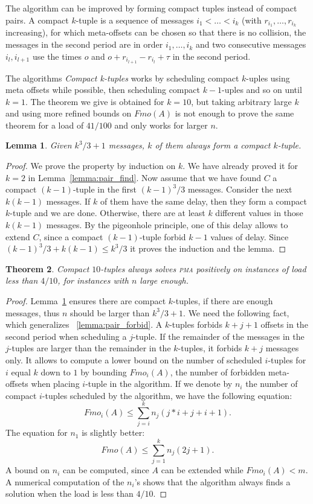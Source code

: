 \documentclass[10pt, conference, letterpaper]{IEEEtran}
\newtheorem{theorem}{Theorem}
\newtheorem{lemma}[theorem]{Lemma}
\newcommand\pma{\textsc{pma}\xspace}
\begin{document}
The algorithm can be improved by forming compact tuples instead of compact pairs.
A compact $k$-tuple is a sequence of messages $i_1 < \dots < i_k$ (with $r_{i_1},\dots,r_{i_k}$ increasing), for which meta-offsets can be chosen so that there is no collision,
the messages in the second period are in order $i_1,\dots,i_k$ and two consecutive messages $i_{l},i_{l+1}$ use the times $o$ and $o + r_{i_{l+1}} -r_{i_{l}} + \tau$ in the second period.

The algorithms \emph{Compact k-tuples} works by scheduling compact $k$-uples
using meta offsets while possible, then scheduling compact $k-1$-uples and so on until $k=1$.
The theorem we give is obtained for $k=10$, but taking arbitrary large $k$ and using more refined bounds on $Fmo(A)$ is not enough to prove the same theorem for a load of $41/100$ and only works for larger $n$.


\begin{lemma}\label{lemma:uple_find}
Given $k^3/3 + 1$ messages, $k$ of them always form a compact $k$-tuple. 
\end{lemma}
\begin{proof}
We prove the property by induction on $k$. We have already proved it for $k=2$ in Lemma~\ref{lemma:pair_find}.
Now assume that we have found $C$ a compact $(k-1)$-tuple in the first $(k-1)^3/3$
messages. Consider the next $k(k-1)$ messages. If $k$ of them have the same delay,
then they form a compact $k$-tuple and we are done. Otherwise, there are at least $k$ different values
in those $k(k-1)$ messages. By the pigeonhole principle, one of this delay allows to extend $C$, since 
a compact $(k-1)$-tuple forbid $k-1$ values of delay. Since $(k-1)^3/3 + k(k-1) \leq k^3/3$ it proves the induction and the lemma.
\end{proof}


\begin{theorem}
Compact $10$-tuples always solves \pma positively on instances of load less than $4/10$, for instances with $n$ large enough.
\end{theorem}
\begin{proof}
Lemma~\ref{lemma:uple_find} ensures there are compact $k$-tuples, if there are enough messages,
thus $n$ should be larger than $k^3/3 +1$. 
We need the following fact, which generalizes ~\ref{lemma:pair_forbid}. A $k$-tuples forbids $k+j+1$ offsets in the second period when scheduling a $j$-tuple. If the remainder of the messages in the $j$-tuples are larger than the remainder in the $k$-tuples, it forbids $k+j$ messages only.
It allows to compute a lower bound on the number of scheduled $i$-tuples for $i$ equal $k$ down to $1$ by bounding $Fmo_i(A)$, the number of forbidden meta-offsets when placing $i$-tuple in the algorithm.
If we denote by $n_i$ the number of compact $i$-tuples scheduled by the algorithm,
we have the following equation:  $$ Fmo_i(A) \leq \displaystyle{\sum_{j=i}^k n_j(j*i + j + i+ 1)}.$$
The equation for $n_1$ is slightly better: 
$$ Fmo(A) \leq \displaystyle{\sum_{j=1}^k n_j(2j + 1)}.$$
A bound on $n_i$ can be computed, since $A$ can be extended while $Fmo_i(A) < m$. A numerical computation of the $n_i$'s shows that the algorithm always finds a solution when the load is less than $4/10$.
\end{proof}
\end{document}

